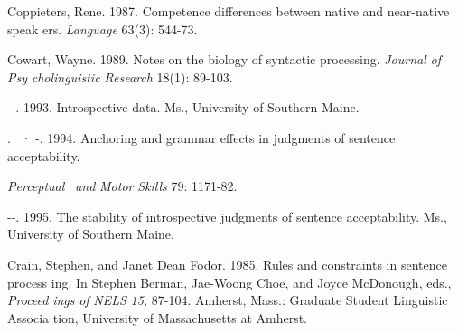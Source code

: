 \begin{styleStandard}
Coppieters, Rene. 1987. Competence differences between native and near-native speak\- ers. \textit{Language}\textit{ }63(3): 544{}-73.
\end{styleStandard}


\begin{styleStandard}
Cowart, Wayne. 1989. Notes on the biology of syntactic processing. \textit{Journal}\textit{ }\textit{of}\textit{ }\textit{Psy\-}\textit{ }\textit{cholinguistic Research}\textit{ }18(1): 89-103.
\end{styleStandard}


\begin{listWWNumixleveli}
\item 
\begin{styleStandard}
{}-{}-. 1993. Introspective data. Ms., University of Southern Maine.
\end{styleStandard}


\item 
\begin{styleStandard}
. \ · {}-. 1994. Anchoring and grammar effects in judgments of sentence acceptability.
\end{styleStandard}


\end{listWWNumixleveli}
\begin{styleStandard}
\textit{Perceptual }\textit{\ }\textit{and}\textit{ }\textit{Motor}\textit{ }\textit{Skills}\textit{ }79: 1171-82.
\end{styleStandard}


\begin{listWWNumixleveli}
\item 
\begin{styleStandard}
{}-{}-. 1995. The stability of introspective judgments of sentence acceptability. Ms., University of Southern Maine.
\end{styleStandard}


\end{listWWNumixleveli}
\begin{styleStandard}
Crain, Stephen, and Janet Dean Fodor. 1985. Rules and constraints in sentence process\- ing. In Stephen Berman, Jae-Woong Choe, and Joyce McDonough, eds., \textit{Proceed\-}\textit{ }\textit{ings}\textit{ }\textit{of}\textit{ }\textit{NELS}\textit{ }\textit{15, }87-104. Amherst, Mass.: Graduate Student Linguistic Associa\- tion, University of Massachusetts at Amherst.
\end{styleStandard}



